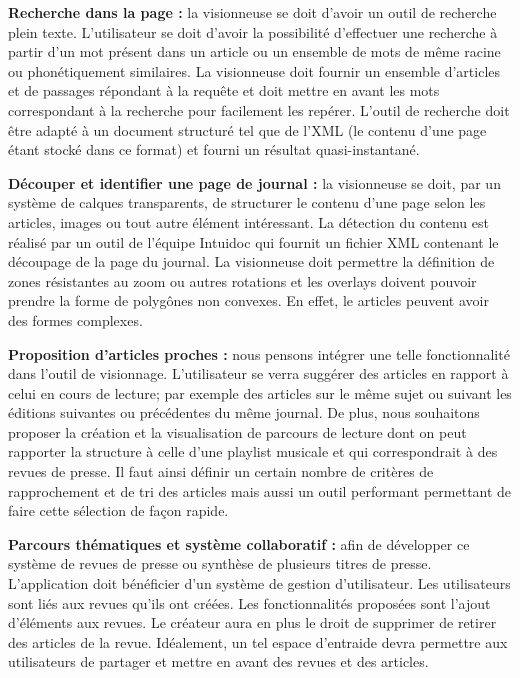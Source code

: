     \textbf{Recherche dans la page :} la visionneuse se doit d’avoir un outil de recherche plein texte. L’utilisateur se doit d’avoir la possibilité
    d’effectuer une recherche à partir d’un mot présent dans un article ou un ensemble de mots de même racine ou phonétiquement similaires.
    La visionneuse doit fournir un ensemble d’articles et de passages répondant à la requête et doit mettre en avant les mots correspondant à la recherche pour facilement les repérer.
    L’outil de recherche doit être adapté à un document structuré tel que de l’XML (le contenu d’une page étant stocké dans ce format) et fourni
    un résultat quasi-instantané.


    \textbf{Découper et identifier une page de journal :} la visionneuse se doit, par un système de calques transparents, de structurer le contenu d’une page selon
    les articles, images ou tout autre élément intéressant. La détection du contenu est réalisé par un outil de l’équipe Intuidoc qui fournit un
    fichier XML contenant le découpage de la page du journal. La visionneuse doit permettre la définition de zones résistantes au zoom ou autres
    rotations et les overlays doivent pouvoir prendre la forme de polygônes non convexes. En effet, le articles peuvent avoir des formes complexes.


    \textbf{Proposition d’articles proches :} nous pensons intégrer une telle fonctionnalité dans l’outil de visionnage. L'utilisateur se verra
    suggérer des articles en rapport à celui en cours de lecture; par exemple des articles sur le même sujet ou suivant les éditions suivantes ou précédentes
    du même journal. De plus, nous souhaitons proposer la création et la visualisation de parcours de lecture dont on peut rapporter la structure
    à celle d’une playlist musicale et qui correspondrait à des revues de presse. Il faut ainsi définir un certain nombre de critères de rapprochement
    et de tri des articles mais aussi un outil performant permettant de faire cette sélection de façon rapide.


    \textbf{Parcours thématiques et système collaboratif :} afin de développer ce système de revues de presse ou synthèse de plusieurs titres de presse. L’application doit bénéficier d’un
    système de gestion d’utilisateur. Les utilisateurs sont liés aux revues qu’ils ont créées. Les fonctionnalités proposées sont l’ajout d'éléments
    aux revues. Le créateur aura en plus le droit de supprimer de retirer des articles de la revue. Idéalement, un tel espace d’entraide devra permettre
    aux utilisateurs de partager et mettre en avant des revues et des articles.
